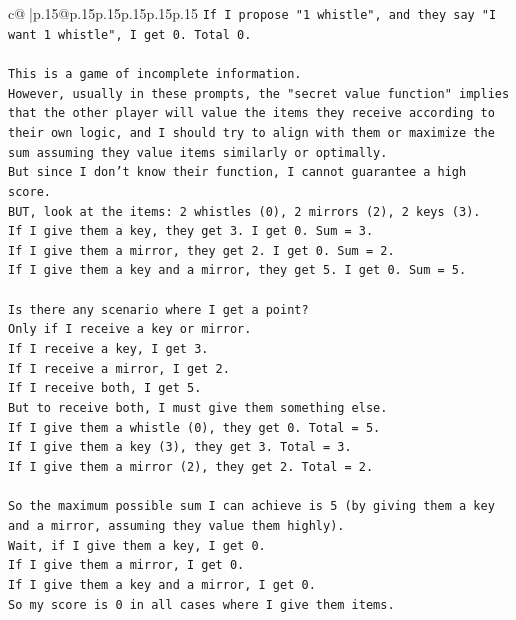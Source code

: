 \documentclass{article}
\begin{document}
{\begin{supertabular}{c@{$\;$}|p{.15\linewidth}@{}p{.15\linewidth}p{.15\linewidth}p{.15\linewidth}p{.15\linewidth}p{.15\linewidth}}
{{{\texttt{If I propose "1 whistle", and they say "I want 1 whistle", I get 0. Total 0.} \\
\\ 
\texttt{This is a game of incomplete information.} \\
\texttt{However, usually in these prompts, the "secret value function" implies that the other player will value the items they receive according to their own logic, and I should try to align with them or maximize the sum assuming they value items similarly or optimally.} \\
\texttt{But since I don't know their function, I cannot guarantee a high score.} \\
\texttt{BUT, look at the items: 2 whistles (0), 2 mirrors (2), 2 keys (3).} \\
\texttt{If I give them a key, they get 3. I get 0. Sum = 3.} \\
\texttt{If I give them a mirror, they get 2. I get 0. Sum = 2.} \\
\texttt{If I give them a key and a mirror, they get 5. I get 0. Sum = 5.} \\
\\ 
\texttt{Is there any scenario where I get a point?} \\
\texttt{Only if I receive a key or mirror.} \\
\texttt{If I receive a key, I get 3.} \\
\texttt{If I receive a mirror, I get 2.} \\
\texttt{If I receive both, I get 5.} \\
\texttt{But to receive both, I must give them something else.} \\
\texttt{If I give them a whistle (0), they get 0. Total = 5.} \\
\texttt{If I give them a key (3), they get 3. Total = 3.} \\
\texttt{If I give them a mirror (2), they get 2. Total = 2.} \\
\\ 
\texttt{So the maximum possible sum I can achieve is 5 (by giving them a key and a mirror, assuming they value them highly).} \\
\texttt{Wait, if I give them a key, I get 0.} \\
\texttt{If I give them a mirror, I get 0.} \\
\texttt{If I give them a key and a mirror, I get 0.} \\
\texttt{So my score is 0 in all cases where I give them items.} \\
}}}
\end{supertabular}}
\end{document}
